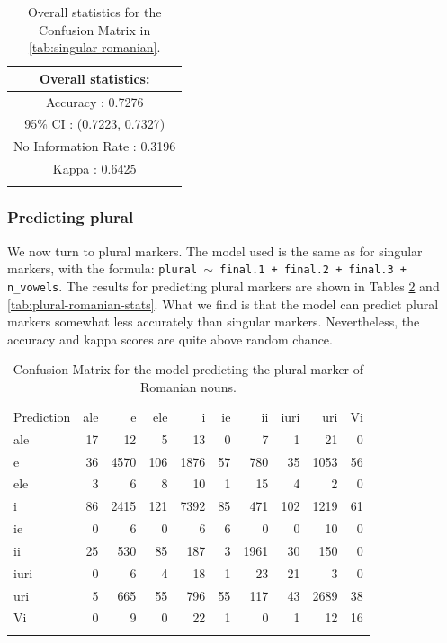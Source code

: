 \begin{table}[!htpb]
  \centering
  \begin{tabular}{c}
    \lsptoprule
    Overall statistics: \\
    \midrule
    Accuracy : 0.7276                                 \\
    95\% CI : (0.7223, 0.7327)                        \\
    No Information Rate : 0.3196                      \\
    Kappa : 0.6425                                    \\
    \lspbottomrule
  \end{tabular}
  \caption{Overall statistics for the Confusion Matrix in \ref{tab:singular-romanian}.}\label{tab:singular-romanian-stats}
\end{table}

\subsubsection{Predicting plural}

We now turn to plural markers. The model used is the same as for singular markers, with the formula: \texttt{plural $\sim$ final.1 + final.2 + final.3 + n\_vowels}. The results for predicting plural markers are shown in Tables \ref{tab:plural-romanian} and \ref{tab:plural-romanian-stats}. What we find is that the model can predict plural markers somewhat less accurately than singular markers. Nevertheless, the accuracy and kappa scores are quite above random chance.

\begin{table}[!htpb]
  \centering
  \begin{tabular}{lrrrrrrrrr}
    \lsptoprule
    \multicolumn{10}{c}{Reference}                                      \\
    \midrule
    Prediction & ale & e    & ele & i    & ie & ii   & iuri & uri  & Vi \\
    ale        & 17  & 12   & 5   & 13   & 0  & 7    & 1    & 21   & 0  \\
    e          & 36  & 4570 & 106 & 1876 & 57 & 780  & 35   & 1053 & 56 \\
    ele        & 3   & 6    & 8   & 10   & 1  & 15   & 4    & 2    & 0  \\
    i          & 86  & 2415 & 121 & 7392 & 85 & 471  & 102  & 1219 & 61 \\
    ie         & 0   & 6    & 0   & 6    & 6  & 0    & 0    & 10   & 0  \\
    ii         & 25  & 530  & 85  & 187  & 3  & 1961 & 30   & 150  & 0  \\
    iuri       & 0   & 6    & 4   & 18   & 1  & 23   & 21   & 3    & 0  \\
    uri        & 5   & 665  & 55  & 796  & 55 & 117  & 43   & 2689 & 38 \\
    Vi         & 0   & 9    & 0   & 22   & 1  & 0    & 1    & 12   & 16 \\
    \lspbottomrule
  \end{tabular}
  \caption{Confusion Matrix for the model predicting the plural marker of Romanian nouns.}
  \label{tab:plural-romanian}
\end{table}

